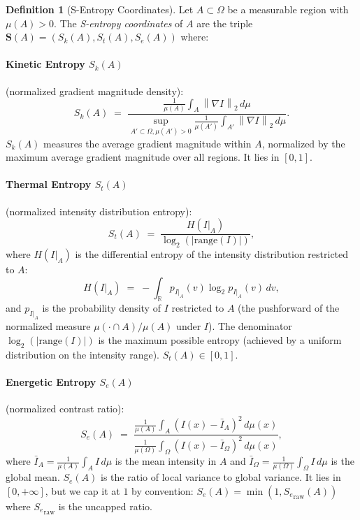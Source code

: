 \documentclass[twocolumn]{article}
\theoremstyle{plain}
\theoremstyle{definition}
\newtheorem{definition}[theorem]{Definition}
\newcommand{\Sk}{S_k}
\newcommand{\St}{S_t}
\newcommand{\Se}{S_e}
\newcommand{\bS}{\mathbf{S}}
\newcommand{\reals}{\mathbb{R}}
\newcommand{\norm}[1]{\left\lVert #1 \right\rVert}
\newcommand{\abs}[1]{\left\lvert #1 \right\rvert}
\begin{document}
\begin{definition}[S-Entropy Coordinates]
\label{def:sentropy}
Let $A \subset \Omega$ be a measurable region with $\mu(A) > 0$. The
\emph{S-entropy coordinates} of $A$ are the triple $\bS(A) = (\Sk(A), \St(A), \Se(A))$
where:

\paragraph{Kinetic Entropy $\Sk(A)$} (normalized gradient magnitude density):
\[
  \Sk(A) \;=\; \frac{\displaystyle\frac{1}{\mu(A)} \int_A \norm{\nabla I}_2 \, d\mu}
                    {\displaystyle\sup_{A' \subset \Omega, \mu(A')>0}
                      \frac{1}{\mu(A')} \int_{A'} \norm{\nabla I}_2 \, d\mu}.
\]
$\Sk(A)$ measures the average gradient magnitude within $A$, normalized by the
maximum average gradient magnitude over all regions. It lies in $[0,1]$.

\paragraph{Thermal Entropy $\St(A)$} (normalized intensity distribution entropy):
\[
  \St(A) \;=\; \frac{H(I|_A)}{\log_2(\abs{\mathrm{range}(I)})},
\]
where $H(I|_A)$ is the differential entropy of the intensity distribution
restricted to $A$:
\[
  H(I|_A) \;=\; -\int_{\reals} p_{I|_A}(v) \log_2 p_{I|_A}(v) \, dv,
\]
and $p_{I|_A}$ is the probability density of $I$ restricted to $A$
(the pushforward of the normalized measure $\mu(\cdot \cap A)/\mu(A)$ under $I$).
The denominator $\log_2(|\mathrm{range}(I)|)$ is the maximum possible entropy
(achieved by a uniform distribution on the intensity range). $\St(A) \in [0,1]$.

\paragraph{Energetic Entropy $\Se(A)$} (normalized contrast ratio):
\[
  \Se(A) \;=\; \frac{\displaystyle\frac{1}{\mu(A)}\int_A (I(x) - \bar{I}_A)^2 \, d\mu(x)}
                    {\displaystyle\frac{1}{\mu(\Omega)}\int_\Omega (I(x) - \bar{I}_\Omega)^2 \, d\mu(x)},
\]
where $\bar{I}_A = \frac{1}{\mu(A)}\int_A I \, d\mu$ is the mean intensity in $A$
and $\bar{I}_\Omega = \frac{1}{\mu(\Omega)}\int_\Omega I \, d\mu$ is the global
mean. $\Se(A)$ is the ratio of local variance to global variance. It lies in
$[0,+\infty]$, but we cap it at $1$ by convention: $\Se(A) = \min(1, {S_e}_{\text{raw}}(A))$
where ${S_e}_{\text{raw}}$ is the uncapped ratio.
\end{definition}
\end{document}
